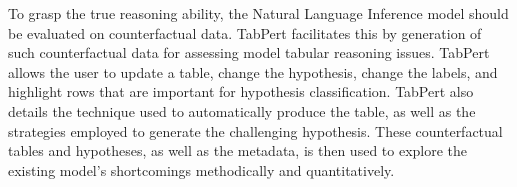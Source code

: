 To grasp the true reasoning ability, the Natural Language Inference model should be evaluated on counterfactual data. TabPert facilitates this by generation of such counterfactual data for assessing model tabular reasoning issues. TabPert allows the user to update a table, change the hypothesis, change the labels, and highlight rows that are important for hypothesis classification. TabPert also details the technique used to automatically produce the table, as well as the strategies employed to generate the challenging hypothesis. These counterfactual tables and hypotheses, as well as the metadata, is then used to explore the existing model's shortcomings methodically and quantitatively.